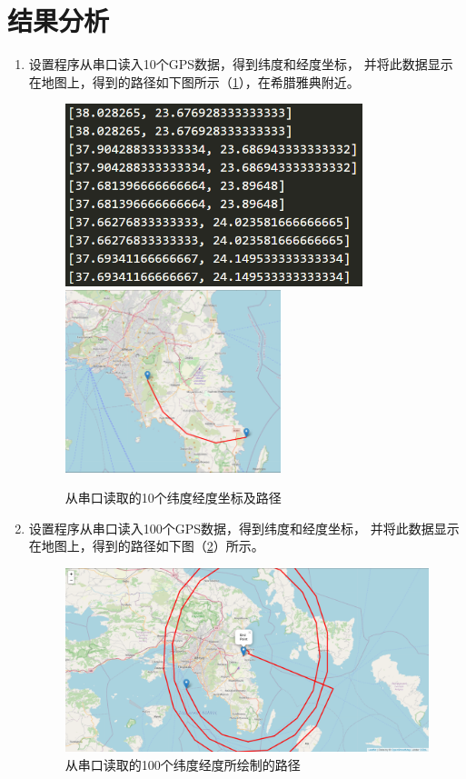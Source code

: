 \documentclass[UTF-8, a4paper, 12pt]{ctexart}
\begin{document}
\newpage
\section{结果分析}

\begin{enumerate}
    \item 设置程序从串口读入10个GPS数据，得到纬度和经度坐标，
    并将此数据显示在地图上，得到的路径如下图所示（\ref{f8}），在希腊雅典附近。
\begin{figure}[htbp]
    \centering
    \includegraphics[height=5.3cm]{figs/f8.png}    
    \includegraphics[height=5.3cm]{figs/f14.png}
    \caption{从串口读取的10个纬度经度坐标及路径}
    \label{f8}
\end{figure}



\item 设置程序从串口读入100个GPS数据，得到纬度和经度坐标，
并将此数据显示在地图上，得到的路径如下图（\ref{f10}）所示。
\begin{figure}[htbp]
    \centering
    \includegraphics[width=15cm]{figs/f9.png}
    \caption{从串口读取的100个纬度经度所绘制的路径}
    \label{f10}
\end{figure}


\end{enumerate}
\end{document}
